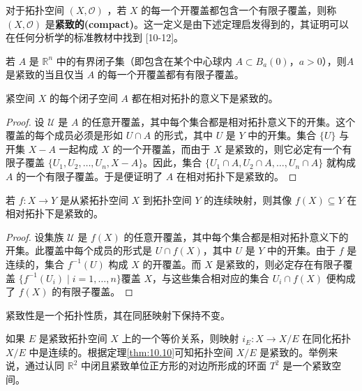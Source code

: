 	对于拓扑空间 $(X,\mathcal{O} )$ ，若 $X$ 的每一个开覆盖都包含一个有限子覆盖，则称 $(X,\mathcal{O} )$ 是\textbf{紧致的(compact)}。这一定义是由下述定理启发得到的，其证明可以在任何分析学的标准教材中找到 [10-12]。

\begin{theorem}[海涅-博雷尔定理]\label{thm:10.8} 
	若 $A$ 是 $\mathbb{R}^{n}$ 中的有界闭子集（即包含在某个中心球内 $A\subset B_{a} (0)$，$a >0$），则$A$ 是紧致的当且仅当 $A$ 的每一个开覆盖都有有限子覆盖。
\end{theorem}

\begin{theorem}\label{thm:10.9} 
	紧空间 $X$ 的每个闭子空间 $A$ 都在相对拓扑的意义下是紧致的。
\end{theorem}

\begin{proof}
	设 $\mathcal{U}$ 是 $A$ 的任意开覆盖，其中每个集合都是相对拓扑意义下的开集。这个覆盖的每个成员必须是形如 $U\cap A$ 的形式，其中 $U$ 是 $Y$ 中的开集。集合 $\{U\}$ 与开集 $X-A$ 一起构成 $X$ 的一个开覆盖，而由于 $X$ 是紧致的，则它必定有一个有限子覆盖 $\{U_{1} ,U_{2} ,\dotsc ,U_{n} ,X-A\}$。因此，集合 $\{U_{1} \cap A,U_{2} \cap A,\dotsc ,U_{n} \cap A\}$ 就构成 $A$ 的一个有限子覆盖。于是便证明了 $A$ 在相对拓扑下是紧致的。
\end{proof}

\begin{theorem}\label{thm:10.10} 
	若 $f:X\rightarrow Y$ 是从紧拓扑空间 $X$ 到拓扑空间 $Y$ 的连续映射，则其像 $f(X)\subseteq Y$ 在相对拓扑下是紧致的。
\end{theorem}

\begin{proof}
	设集族 $\mathcal{U}$ 是 $f(X)$ 的任意开覆盖，其中每个集合都是相对拓扑意义下的开集。此覆盖中每个成员的形式是 $U\cap f(X)$，其中 $U$ 是 $Y$ 中的开集。由于 $f$ 是连续的，集合 $f^{-1} (U)$ 构成 $X$ 的开覆盖。而 $X$ 是紧致的，则必定存在有限子覆盖 $\{f^{-1} (U_{i} )\mid i=1,\dotsc ,n\}$覆盖 $X$，与这些集合相对应的集合 $U_{i} \cap f(X)$ 便构成了 $f(X)$ 的有限子覆盖。
\end{proof}

	紧致性是一个拓扑性质，其在同胚映射下保持不变。

\begin{eg}\label{eg:10.16} 
	如果 $E$ 是紧致拓扑空间 $X$ 上的一个等价关系，则映射 $i_{E} :X\rightarrow X/E$ 在同化拓扑 $X/E$ 中是连续的。根据定理\ref{thm:10.10}可知拓扑空间 $X/E$ 是紧致的。举例来说，通过认同 $\mathbb{R}^{2}$ 中闭且紧致单位正方形的对边所形成的环面 $T^{2}$ 是一个紧致空间。
\end{eg}

